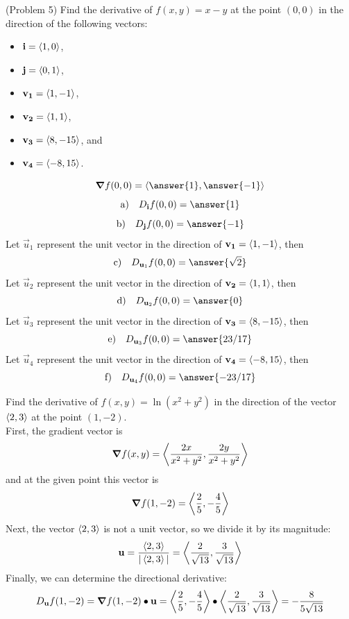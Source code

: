 \documentclass[handout]{ximera}
\begin{document}
\begin{problem}(Problem 5)
Find the derivative of $f(x,y) = x-y$ at the point $(0,0)$ in the direction 
of the following vectors:
\begin{itemize}
\item[a)] $\mathbf{i} = \left\langle 1,0\right\rangle$,
\item[b)] $\mathbf{j} = \left\langle 0,1\right\rangle$,
\item[c)] $\mathbf{v_1} = \left\langle 1,-1\right\rangle$,
\item[d)] $\mathbf{v_2} = \left\langle 1, 1\right\rangle$,
\item[e)] $\mathbf{v_3} = \left\langle 8,-15\right\rangle$, and
\item[f)] $\mathbf{v_4} = \left\langle -8, 15\right\rangle$.
\end{itemize}
\[
\grad f(0,0) = \vector{\answer{1}, \answer{-1}}
\]
\[
\text{a)} \quad D_{\vec i} f(0,0) = \answer{1}
\]
\[
\text{b)} \quad D_{\vec j} f(0,0) = \answer{-1}
\]
Let $\vec u_1$ represent the unit vector in the direction of $\mathbf{v_1} = \left\langle 1,-1\right\rangle$, then 
\[
\text{c)} \quad D_{\vec u_1} f(0,0) = \answer{\sqrt 2}
\]
Let $\vec u_2$ represent the unit vector in the direction of $\mathbf{v_2} = \left\langle 1,1\right\rangle$, then 
\[
\text{d)} \quad D_{\vec u_2} f(0,0) = \answer{0}
\]
Let $\vec u_3$ represent the unit vector in the direction of $\mathbf{v_3} = \left\langle 8,-15\right\rangle$, then 
\[
\text{e)} \quad D_{\vec u_3} f(0,0) = \answer{23/17}
\]
Let $\vec u_4$ represent the unit vector in the direction of $\mathbf{v_4} = \left\langle -8,15\right\rangle$, then 
\[
\text{f)} \quad D_{\vec u_4} f(0,0) = \answer{-23/17}
\]

\end{problem}


\begin{example}[Example 6]
Find the derivative of $f(x,y) = \ln(x^2 + y^2)$ in the direction of the 
vector $\left\langle 2, 3\right\rangle$ at the point $(1, -2)$.\\
First, the gradient vector is
\[
\boldsymbol\nabla f(x,y) = \left\langle \frac{2x}{x^2 +y^2}, \frac{2y}{x^2 +y^2}\right\rangle
\]
and at the given point this vector is
\[
\boldsymbol\nabla f(1,-2) = \left\langle \frac{2}{5}, -\frac{4}{5}\right\rangle
\]
Next, the vector $\left\langle 2, 3\right\rangle$ is not a unit vector, so we divide it by its magnitude:
\[
\mathbf u = \frac{\left\langle 2, 3\right\rangle}{|\left\langle 2, 3\right\rangle|} = 
\left\langle \frac{2}{\sqrt{13}}, \frac{3}{\sqrt{13}}\right\rangle
\]
Finally, we can determine the directional derivative:
\[
D_{\mathbf u} f(1, -2) = \boldsymbol\nabla f(1,-2) \bullet \mathbf u = 
\left\langle \frac{2}{5}, -\frac{4}{5}\right\rangle \bullet 
\left\langle \frac{2}{\sqrt{13}}, \frac{3}{\sqrt{13}}\right\rangle = -\frac{8}{5\sqrt{13}}
\]
\end{example}
\end{document}
